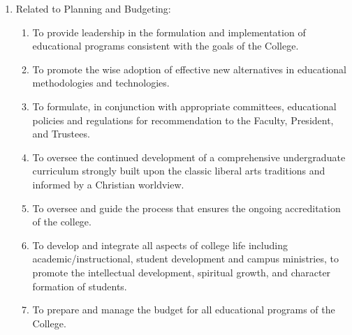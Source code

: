 \begin{enumerate}
{\begin{enumerate}
{\begin{enumerate}
{\begin{enumerate}
											\end{enumerate}
										}
										\item{To serve \emph{ex officio} on College committees and to chair the following:
											\begin{enumerate}
												\item{Faculty meeting as a committee of the whole}
												\item{Academic Senate}
												\item{and to establish ad hoc committees as may be appropriate}
											\end{enumerate}
										}
									\end{enumerate}
								}
								\item{Related to Planning and Budgeting:
									\begin{enumerate}
										\item{To provide leadership in the formulation and implementation of educational programs consistent with the goals of the College.}
										\item{To promote the wise adoption of effective new alternatives in educational methodologies and technologies.}
										\item{To formulate, in conjunction with appropriate committees, educational policies and regulations for recommendation to the Faculty, President, and Trustees.}
										\item{To oversee the continued development of a comprehensive undergraduate curriculum strongly built upon the classic liberal arts traditions and informed by a Christian worldview.}
										\item{To oversee and guide the process that ensures the ongoing accreditation of the college.}
										\item{To develop and integrate all aspects of college life including academic/instructional, student development and campus ministries, to promote the intellectual development, spiritual growth, and character formation of students.}
										\item{To prepare and manage the budget for all educational programs of the College.}
									\end{enumerate}
								}
							\end{enumerate}
						}
					\end{enumerate}

